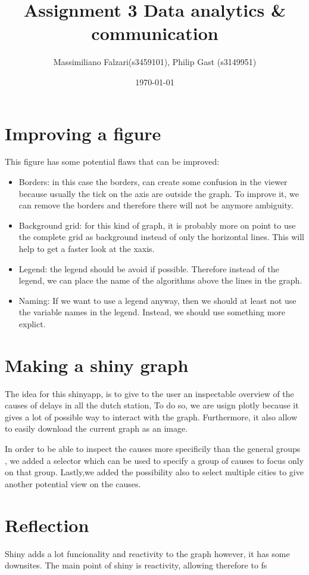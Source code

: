 \documentclass[11pt]{article}
\author{Massimiliano Falzari(s3459101),  Philip Gast (s3149951)}
\date{\today}
\title{Assignment 3 Data analytics \& communication}
\begin{document}
\maketitle
\tableofcontents


\section{Improving a figure}
\label{sec:orgab4dc4f}
This figure has some potential flaws that can be improved:
\begin{itemize}
\item Borders: in this case the borders,  can create some confusion in the
viewer because usually the tick on the axis are outside the graph.
To improve it, we can remove the borders and therefore there will
not be anymore ambiguity.
\item Background grid: for this kind of graph, it is probably more on
point to use the complete grid as background instead of only the
horizontal lines. This will help to get a faster look at the xaxis.
\item Legend: the legend should be avoid if possible. Therefore instead of
the legend, we can place the name of the algorithms above the lines
in the graph.
\item Naming: If we want to use a legend anyway, then we should at least
not use the variable names in the legend. Instead, we should use
something more explict.
\end{itemize}
\section{Making a shiny graph}
\label{sec:org21d6346}
The idea for this shinyapp, is to give to the user an inspectable
overview of the causes of delays in all the dutch station,
To do so, we are usign plotly  because it gives a lot of
possible way to interact with the graph. Furthermore, it also allow
to easily download the current graph as an image.

In order to be able to inspect the causes more specificily than the
general groups , we added a selector which can be used to specify a
group of causes to focus only on that group.
Lastly,we added the possibility also to select multiple cities to
give another potential view on the causes.

\section{Reflection}
\label{sec:orgc65efec}
Shiny  adds a lot funcionality and reactivity to the graph
however, it has some downsites.
The main point of shiny is reactivity, allowing therefore to  fs
\end{document}
